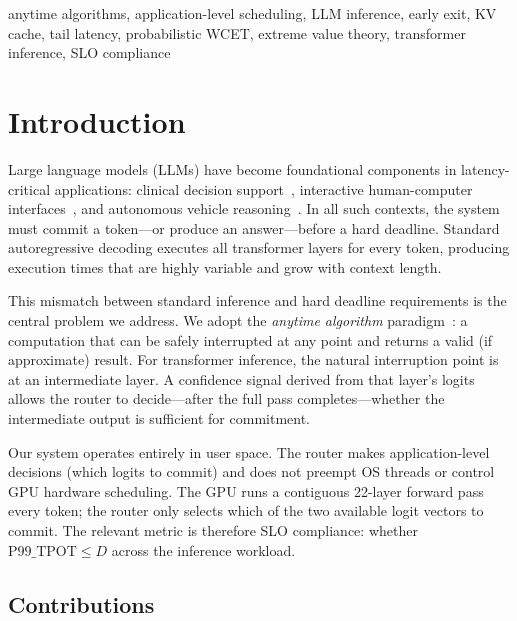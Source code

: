 \documentclass[conference]{IEEEtran}
\begin{document}
\begin{IEEEkeywords}
anytime algorithms, application-level scheduling, LLM inference,
early exit, KV cache, tail latency, probabilistic WCET, extreme value theory,
transformer inference, SLO compliance
\end{IEEEkeywords}

\section{Introduction}

Large language models (LLMs) have become foundational components in
latency-critical applications: clinical decision support~\cite{singhal2023large},
interactive human-computer interfaces~\cite{ouyang2022training}, and
autonomous vehicle reasoning~\cite{wen2023dilu}.
In all such contexts, the system must commit a token---or produce an
answer---before a hard deadline.
Standard autoregressive decoding executes all transformer layers for
every token, producing execution times that are highly variable and
grow with context length.

This mismatch between standard inference and hard deadline requirements
is the central problem we address.
We adopt the \emph{anytime algorithm} paradigm~\cite{boddy1994deliberation,
zilberstein1996using}: a computation that can be safely interrupted at
any point and returns a valid (if approximate) result.
For transformer inference, the natural interruption point is at an
intermediate layer.
A confidence signal derived from that layer's logits allows the router
to decide---after the full pass completes---whether the intermediate
output is sufficient for commitment.

Our system operates entirely in user space.
The router makes application-level decisions (which logits to commit)
and does not preempt OS threads or control GPU hardware scheduling.
The GPU runs a contiguous 22-layer forward pass every token; the router
only selects which of the two available logit vectors to commit.
The relevant metric is therefore SLO compliance: whether
$\text{P99\_TPOT} \leq D$ across the inference workload.

\subsection{Contributions}
\end{document}
